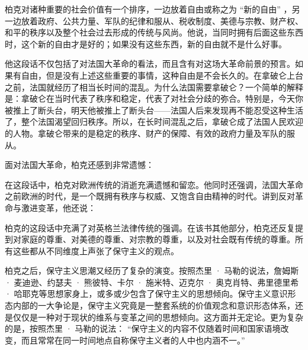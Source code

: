 柏克对诸种重要的社会价值有一个排序，一边放着自由或称之为 “新的自由” ，另一边放着政府、公共力量、军队的纪律和服从、税收制度、美德与宗教、财产权、和平的秩序以及整个社会过去形成的传统与风尚。他说，当同时拥有后面这些东西时，这个新的自由才是好的；如果没有这些东西，新的自由就不是什么好事。

他这段话不仅包括了对法国大革命的看法，而且含有对这场大革命前景的预言。如果有自由，但是没有上述这些重要的事情，这种自由是不会长久的。在拿破仑上台之前，法国就经历了相当长时间的混乱。为什么法国需要拿破仑？一个简单的解释是：拿破仑在当时代表了秩序和稳定，代表了对社会分歧的弥合。特别是，今天你被推上了断头台，明天他被推上了断头台——法国人后来发现再不能忍受这种生活了，整个法国渴望回归秩序。所以，在长时间混乱之后，拿破仑成了法国人民欢迎的人物。拿破仑带来的是稳定的秩序、财产的保障、有效的政府力量及军队的服从。

面对法国大革命，柏克还感到非常遗憾：


在这段话中，柏克对欧洲传统的消逝充满遗憾和留恋。他同时还强调，法国大革命之前欧洲的时代，是一个既拥有秩序与权威、又饱含自由精神的时代。讲到反对革命与激进变革，他还说：


柏克的这段话中充满了对英格兰法律传统的强调。在该书其他部分，柏克还反复提到对家庭的尊重、对美德的尊重、对宗教的尊重，以及对社会既有传统的尊重。所有这些都从不同维度上声张了保守主义的观点。

柏克之后，保守主义思潮又经历了复杂的演变。按照杰里 · 马勒的说法，詹姆斯 · 麦迪逊、约瑟夫 · 熊彼特、卡尔 · 施米特、迈克尔 · 奥克肖特、弗里德里希 · 哈耶克等思想家身上，或多或少包含了保守主义的思想倾向。保守主义意识形态内部的一大争论是，保守主义究竟是一整套系统的价值观念和意识形态体系，还是仅仅是一种对于现状的维系与变革之间的思想倾向。这方面并无定论。更为复杂的是，按照杰里 · 马勒的说法： “保守主义的内容不仅随着时间和国家语境改变，而且常常在同一时间地点自称保守主义者的人中也内涵不一。” 

